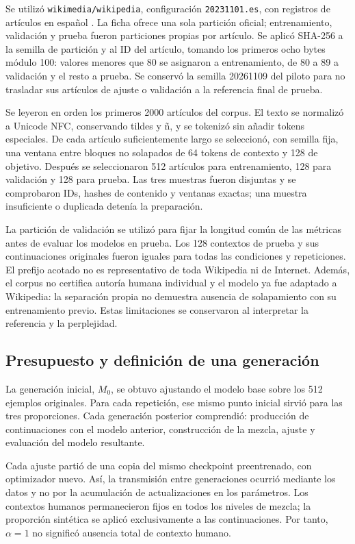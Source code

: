 \documentclass[12pt,letterpaper]{article}
\begin{document}
Se utilizó \texttt{wikimedia/wikipedia}, configuración
\texttt{20231101.es}, con registros de artículos en español
\cite{wikipediacard}. La ficha ofrece una sola partición oficial;
entrenamiento, validación y prueba fueron particiones propias por artículo.
Se aplicó SHA-256 a la semilla de partición y al ID del artículo, tomando
los primeros ocho bytes módulo 100: valores menores que 80 se asignaron
a entrenamiento, de 80 a 89 a validación y el resto a prueba. Se conservó
la semilla 20261109 del piloto para no trasladar sus artículos de ajuste
o validación a la referencia final de prueba.

Se leyeron en orden los primeros 2000 artículos del corpus. El texto
se normalizó a Unicode NFC, conservando tildes y ñ, y se tokenizó sin
añadir tokens especiales. De cada artículo suficientemente largo se
seleccionó, con semilla fija, una ventana entre bloques no solapados de
64 tokens de contexto y 128 de objetivo. Después se seleccionaron 512
artículos para entrenamiento, 128 para validación y 128 para prueba.
Las tres muestras fueron disjuntas y se comprobaron IDs, hashes de contenido
y ventanas exactas; una muestra insuficiente o duplicada detenía la preparación.

La partición de validación se utilizó para fijar la longitud común de las
métricas antes de evaluar los modelos en prueba. Los 128 contextos de prueba y sus continuaciones originales fueron
iguales para todas las condiciones y repeticiones. El prefijo acotado no es
representativo de toda Wikipedia ni de Internet. Además, el corpus no
certifica autoría humana individual y el modelo ya fue adaptado a Wikipedia:
la separación propia no demuestra ausencia de solapamiento con su entrenamiento
previo. Estas limitaciones se conservaron al interpretar la referencia y la
perplejidad.

\subsection{Presupuesto y definición de una generación}

La generación inicial, \(M_0\), se obtuvo ajustando el modelo base sobre
los 512 ejemplos originales. Para cada repetición, ese mismo punto inicial
sirvió para las tres proporciones. Cada generación posterior comprendió:
producción de continuaciones con el modelo anterior, construcción de la
mezcla, ajuste y evaluación del modelo resultante.

Cada ajuste partió de una copia del mismo checkpoint preentrenado, con
optimizador nuevo. Así, la transmisión entre generaciones ocurrió mediante
los datos y no por la acumulación de actualizaciones en los parámetros.
Los contextos humanos permanecieron fijos en todos los niveles de mezcla;
la proporción sintética se aplicó exclusivamente a las continuaciones.
Por tanto, \(\alpha=1\) no significó ausencia total de contexto humano.
\end{document}
